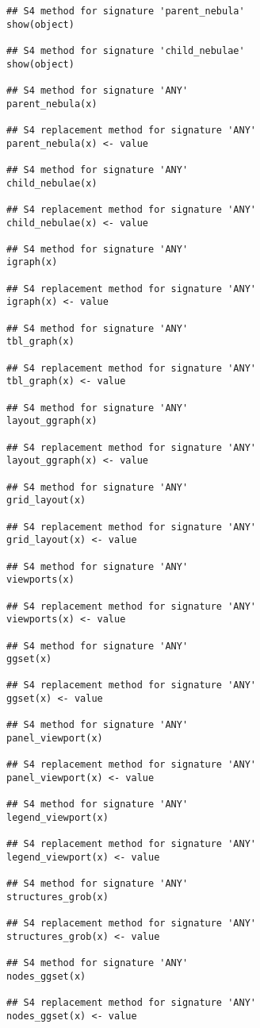\documentclass[letterpaper]{book}
\begin{document}
%
\begin{Usage}
\begin{verbatim}
## S4 method for signature 'parent_nebula'
show(object)

## S4 method for signature 'child_nebulae'
show(object)

## S4 method for signature 'ANY'
parent_nebula(x)

## S4 replacement method for signature 'ANY'
parent_nebula(x) <- value

## S4 method for signature 'ANY'
child_nebulae(x)

## S4 replacement method for signature 'ANY'
child_nebulae(x) <- value

## S4 method for signature 'ANY'
igraph(x)

## S4 replacement method for signature 'ANY'
igraph(x) <- value

## S4 method for signature 'ANY'
tbl_graph(x)

## S4 replacement method for signature 'ANY'
tbl_graph(x) <- value

## S4 method for signature 'ANY'
layout_ggraph(x)

## S4 replacement method for signature 'ANY'
layout_ggraph(x) <- value

## S4 method for signature 'ANY'
grid_layout(x)

## S4 replacement method for signature 'ANY'
grid_layout(x) <- value

## S4 method for signature 'ANY'
viewports(x)

## S4 replacement method for signature 'ANY'
viewports(x) <- value

## S4 method for signature 'ANY'
ggset(x)

## S4 replacement method for signature 'ANY'
ggset(x) <- value

## S4 method for signature 'ANY'
panel_viewport(x)

## S4 replacement method for signature 'ANY'
panel_viewport(x) <- value

## S4 method for signature 'ANY'
legend_viewport(x)

## S4 replacement method for signature 'ANY'
legend_viewport(x) <- value

## S4 method for signature 'ANY'
structures_grob(x)

## S4 replacement method for signature 'ANY'
structures_grob(x) <- value

## S4 method for signature 'ANY'
nodes_ggset(x)

## S4 replacement method for signature 'ANY'
nodes_ggset(x) <- value


\end{verbatim}
\end{Usage}
\end{document}
